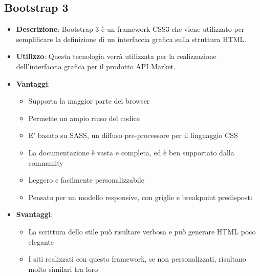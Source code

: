 \subsection{Bootstrap 3}
\begin{itemize}
	\item \textbf{Descrizione}: Bootstrap 3 è un framework CSS3 che viene utilizzato per semplificare la definizione di un interfaccia grafica sulla struttura HTML.
	\item \textbf{Utilizzo}: Questa tecnologia verrà utilizzata per la realizzazione dell'interfaccia grafica per il prodotto API Market.
	\item \textbf{Vantaggi}:
	\begin{itemize}
		\item Supporta la maggior parte dei browser
		\item Permette un ampio riuso del codice
		\item E' basato su SASS, un diffuso pre-processore per il linguaggio CSS
		\item La documentazione è vasta e completa, ed è ben supportato dalla community
		\item Leggero e facilmente personalizzabile
		\item Pensato per un modello responsive, con griglie e breakpoint predisposti
	\end{itemize}
	\item \textbf{Svantaggi}:
	\begin{itemize}
		\item La scrittura dello stile può risultare verbosa e può generare HTML poco elegante
		\item I siti realizzati con questo framework, se non personalizzati, risultano molto similari tra loro
	\end{itemize}
\end{itemize}

